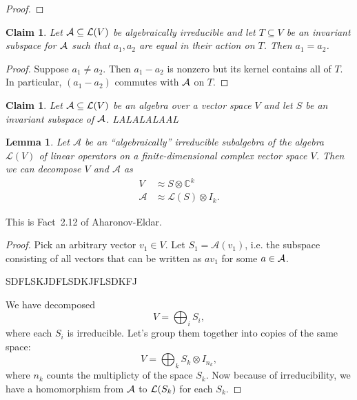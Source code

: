 \documentclass[12pt]{article}
\theoremstyle{plain}
\newtheorem{lemma}[theorem]{Lemma}
\newtheorem{claim}[theorem]{Claim}
\begin{document}
\begin{proof}
\end{proof}

\pagebreak


\begin{claim}
    Let $\mathcal{A} \subseteq \mathcal{L}(V)$ be algebraically irreducible and let $T \subseteq V $ be an invariant subspace for $\mathcal{A}$ such that $a_1, a_2$ are equal in their action on $T$. Then $a_1 = a_2$.
\end{claim}
\begin{proof}
    Suppose $a_1 \neq a_2$. Then $a_1 - a_2$ is nonzero but its kernel contains all of $T$. In particular, $(a_1 - a_2)$ commutes with $\mathcal{A}$ on $T$. 
\end{proof}

\begin{claim}
    Let $\mathcal{A} \subseteq \mathcal{L}(V)$ be an algebra over a vector space $V$ and let $S$ be an invariant subspace of $\mathcal{A}$. LALALALAAL
\end{claim}

\begin{lemma}
    Let $\mathcal{A}$ be an ``algebraically'' irreducible subalgebra of the algebra $\mathcal{L}(V)$ of linear operators on a finite-dimensional complex vector space $V$. Then we can decompose $V$ and $\mathcal{A}$ as
    \begin{align} 
    V &\approx S \otimes \mathbb{C}^k \\
    \mathcal{A} &\approx \mathcal{L}(S) \otimes I_k.
    \end{align}
\end{lemma}
This is Fact~2.12 of Aharonov-Eldar.
\begin{proof}
    Pick an arbitrary vector $v_1 \in V$. Let $S_1 = \mathcal{A}(v_1)$, i.e. the subspace consisting of all vectors that can be written as $a v_1$ for some $a \in \mathcal{A}$. 

    SDFLSKJDFLSDKJFLSDKFJ

    We have decomposed 
    \[ V = \bigoplus_i S_i,\]
    where each $S_i$ is irreducible. Let's group them together into copies of the same space:
    \[V = \bigoplus_k S_k \otimes I_{n_k}, \]
    where $n_k$ counts the multiplicty of the space $S_k$.
    Now because of irreducibility, we have a homomorphism from $\mathcal{A}$ to $\mathcal{L}(S_k)$ for each $S_k$. 
\end{proof}
\newpage
\end{document}
